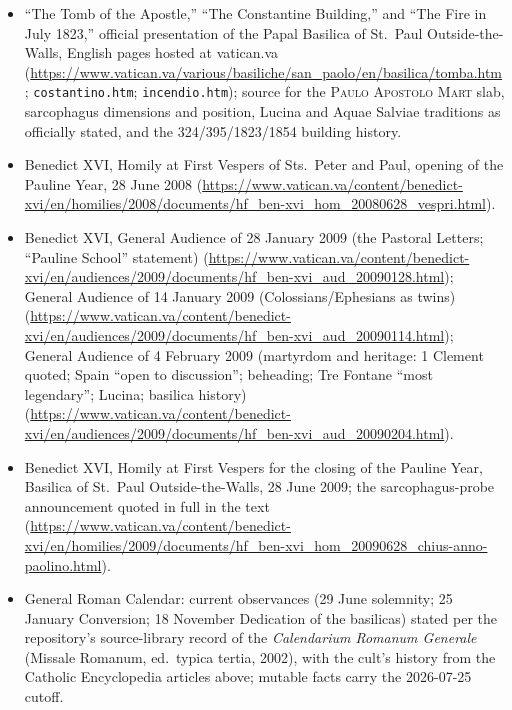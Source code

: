 \begin{itemize}
\item ``The Tomb of the Apostle,'' ``The Constantine Building,'' and
``The Fire in July 1823,'' official presentation of the Papal Basilica of
St.~Paul Outside-the-Walls, English pages hosted at vatican.va
(\url{https://www.vatican.va/various/basiliche/san_paolo/en/basilica/tomba.htm};
\texttt{costantino.htm}; \texttt{incendio.htm}); source for the
\textsc{Paulo Apostolo Mart} slab, sarcophagus dimensions and position,
Lucina and Aquae Salviae traditions as officially stated, and the
324/395/1823/1854 building history.
\item Benedict XVI, Homily at First Vespers of Sts.~Peter and Paul,
opening of the Pauline Year, 28 June 2008
(\url{https://www.vatican.va/content/benedict-xvi/en/homilies/2008/documents/hf_ben-xvi_hom_20080628_vespri.html}).
\item Benedict XVI, General Audience of 28 January 2009 (the Pastoral
Letters; ``Pauline School'' statement)
(\url{https://www.vatican.va/content/benedict-xvi/en/audiences/2009/documents/hf_ben-xvi_aud_20090128.html});
General Audience of 14 January 2009 (Colossians/Ephesians as twins)
(\url{https://www.vatican.va/content/benedict-xvi/en/audiences/2009/documents/hf_ben-xvi_aud_20090114.html});
General Audience of 4 February 2009 (martyrdom and heritage: 1 Clement
quoted; Spain ``open to discussion'';  beheading;
Tre Fontane ``most legendary''; Lucina; basilica history)
(\url{https://www.vatican.va/content/benedict-xvi/en/audiences/2009/documents/hf_ben-xvi_aud_20090204.html}).
\item Benedict XVI, Homily at First Vespers for the closing of the
Pauline Year, Basilica of St.~Paul Outside-the-Walls, 28 June 2009; the
sarcophagus-probe announcement quoted in full in the text
(\url{https://www.vatican.va/content/benedict-xvi/en/homilies/2009/documents/hf_ben-xvi_hom_20090628_chius-anno-paolino.html}).
\item General Roman Calendar: current observances (29 June solemnity;
25 January Conversion; 18 November Dedication of the basilicas) stated
per the repository's source-library record of the \textit{Calendarium
Romanum Generale} (Missale Romanum, ed.\ typica tertia, 2002), with the
cult's history from the Catholic Encyclopedia articles above; mutable
facts carry the 2026-07-25 cutoff.
\end{itemize}

\endgroup
